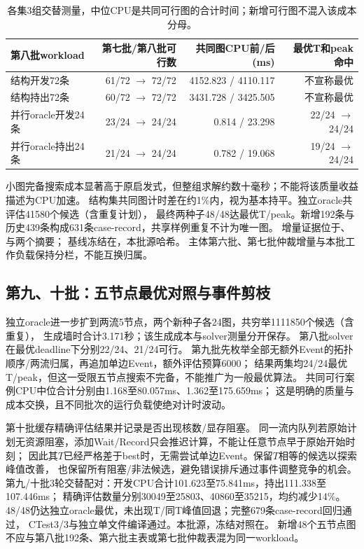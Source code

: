 \documentclass[UTF8,a4paper,11pt,fontset=fandol]{ctexart}
\begin{document}
\begin{table}[ht]\centering\small
\begin{tabular}{lrrr}\toprule
第八批workload & 第七批/第八批可行数 & 共同图CPU前/后(ms) & 最优T和peak命中\\\midrule
结构开发72条 & 61/72 $\to$ 72/72 & 4152.823 / 4110.117 & 不宣称最优\\
结构持出72条 & 60/72 $\to$ 72/72 & 3431.728 / 3425.505 & 不宣称最优\\
并行oracle开发24条 & 23/24 $\to$ 24/24 & 0.814 / 23.298 & 22/24 $\to$ 24/24\\
并行oracle持出24条 & 21/24 $\to$ 24/24 & 0.782 / 19.068 & 19/24 $\to$ 24/24\\\bottomrule
\end{tabular}
\caption{各集3组交替测量，中位CPU是共同可行图的合计时间；新增可行图不混入该成本分母。}
\end{table}
小图完备搜索成本显著高于原启发式，但整组求解约数十毫秒；不能将该质量收益描述为CPU加速。
结构集共同图计时差在约1\%内，视为基本持平。独立oracle共评估41580个候选（含重复计划），
最终两种子48/48达最优T/peak。新增192条与历史439条构成631条case-record，共享样例重复不计为唯一图。
增量证据位于、
与两个摘要；
基线冻结在，本批源哈希。
主体第六批、第七批仲裁增量与本批工作负载保持分栏，不能互换归属。

\subsection{第九、十批：五节点最优对照与事件剪枝}
独立oracle进一步扩到两流5节点，两个新种子各24图，共穷举1111850个候选（含重复），
生成墙时合计3.171秒；该生成成本与solver测量分开保存。
第八批solver在最优deadline下分别22/24、21/24可行。
第九批先枚举全部无额外Event的拓扑顺序/两流归属，再追加单边Event，额外评估预算6000；
结果两集均24/24最优T/peak，但这一受限五节点搜索不完备，不能推广为一般最优算法。
共同可行案例CPU中位合计分别由1.168至80.057ms、1.362至175.659ms；
这是明确的质量与成本交换，且不同批次的运行负载使绝对计时波动。

第十批缓存精确评估结果并记录是否出现核数/显存阻塞。
同一流内队列若原始计划无资源阻塞，添加Wait/Record只会推迟计算，不能让任意节点早于原始开始时刻；
因此其$T$已经严格差于best时，无需尝试单边Event。保留$T$相等的候选以探索峰值改善，
也保留所有阻塞/非法候选，避免错误排斥通过事件调整竞争的机会。
第九/十批3轮交替配对：开发CPU合计101.623至75.841ms，持出111.338至107.446ms；
精确评估数量分别30049至25803、40860至35215，均约减少14\%。
48/48仍达独立oracle最优，未出现T/同T峰值回退；完整679条case-record回归通过，
CTest3/3与独立单文件编译通过。本批源，冻结对照在。
新增48个五节点图不应与第八批192条、第六批主表或第七批仲裁表混为同一workload。
\end{document}

